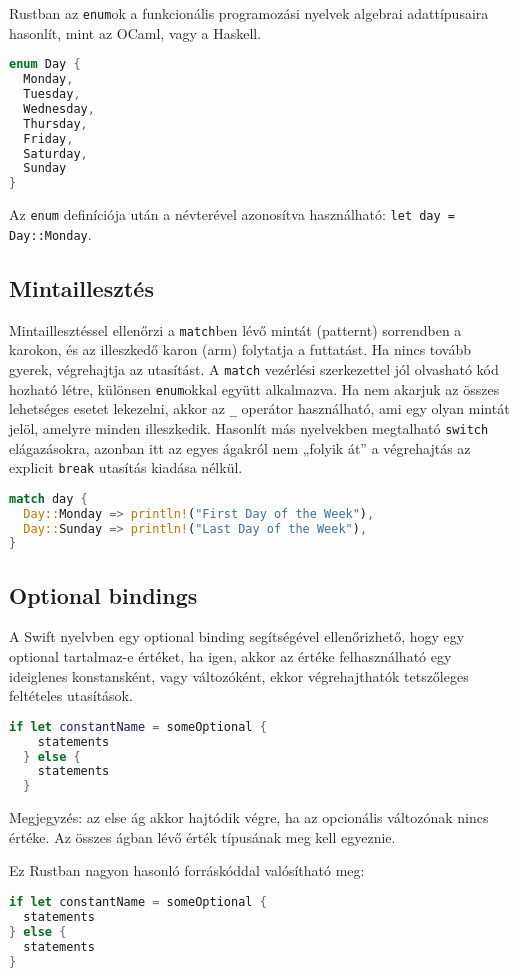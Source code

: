 Rustban az \lstinline{enum}ok a funkcionális programozási nyelvek algebrai adattípusaira hasonlít, mint az OCaml, vagy a Haskell.
\begin{lstlisting}[language=Rust, style=boxed]
enum Day {
  Monday,
  Tuesday,
  Wednesday,
  Thursday,
  Friday,
  Saturday,
  Sunday
}
\end{lstlisting}
Az \lstinline{enum} definíciója után a névterével azonosítva használható: \lstinline{let day = Day::Monday}.

\subsection{Mintaillesztés}
Mintaillesztéssel ellenőrzi a \lstinline{match}ben lévő mintát (patternt) sorrendben a karokon, és az illeszkedő karon (arm) folytatja a futtatást. Ha nincs tovább gyerek, végrehajtja az utasítást. A \lstinline{match} vezérlési szerkezettel jól olvasható kód hozható létre, különsen \lstinline{enum}okkal együtt alkalmazva. Ha nem akarjuk az összes lehetséges esetet lekezelni, akkor az \lstinline{_} operátor használható, ami egy olyan mintát jelöl, amelyre minden illeszkedik. Hasonlít más nyelvekben megtalható \lstinline{switch} elágazásokra, azonban itt az egyes ágakról nem „folyik át” a végrehajtás az explicit \lstinline{break} utasítás kiadása nélkül.
\begin{lstlisting}[language=Rust, style=boxed]
match day {
  Day::Monday => println!("First Day of the Week"),
  Day::Sunday => println!("Last Day of the Week"),
}
\end{lstlisting}

\subsection{Optional bindings}
A Swift nyelvben egy optional binding segítségével ellenőrizhető, hogy egy optional tartalmaz-e értéket, ha igen, akkor az értéke felhasználható egy ideiglenes konstansként, vagy változóként, ekkor végrehajthatók tetszőleges feltételes utasítások. %
\begin{lstlisting}[language=Swift]
  if let constantName = someOptional {
    statements
  } else {
    statements
  }
\end{lstlisting}
Megjegyzés: az else ág akkor hajtódik végre, ha az opcionális változónak nincs értéke. Az összes ágban lévő érték típusának meg kell egyeznie.

Ez Rustban nagyon hasonló forráskóddal valósítható meg:
\begin{lstlisting}[language=Rust, style=boxed, style=colouredRust]
if let constantName = someOptional {
  statements
} else {
  statements
}
\end{lstlisting}


